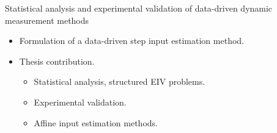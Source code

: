\documentclass[presentation]{beamer}
\begin{document}
\begin{frame}[label={slides:preview}]{Statistical analysis and experimental validation \linebreak of data-driven dynamic measurement methods}
\begin{itemize}
	\item Formulation of a data-driven step input estimation method.
	\vspace{0.5cm}
	\color{gray}
	\item Thesis contribution.
	\begin{itemize}
		\color{gray}
 		\item Statistical analysis, structured EIV problems.
		\item Experimental validation.
		\item Affine input estimation methods.
 	\end{itemize}
\end{itemize}
\color{black}
\end{frame}
\end{document}

